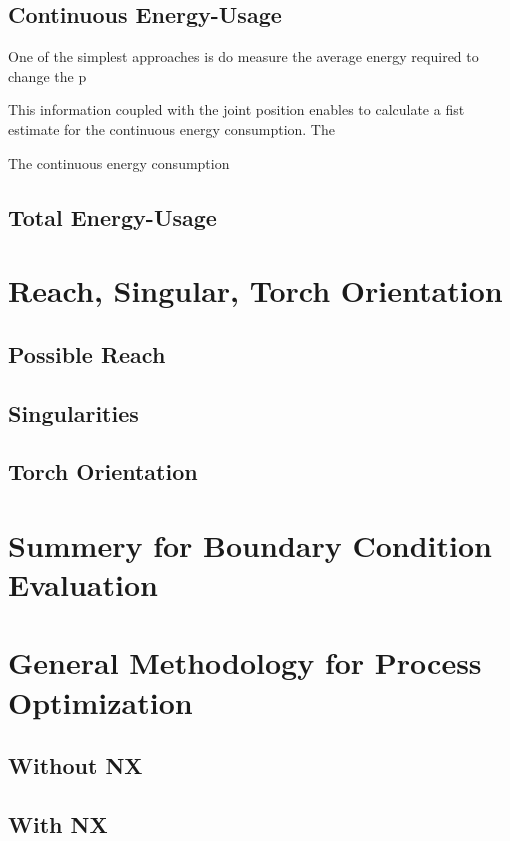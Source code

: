 \subsection{Continuous Energy-Usage}
One of the simplest approaches is do measure the average energy required to change the p

This information coupled with the joint position enables to calculate a fist estimate for the continuous energy consumption. The 

  
 
The continuous energy consumption 

\subsection{Total Energy-Usage}
\section{Reach, Singular, Torch Orientation}
\subsection{Possible Reach}
\subsection{Singularities }
\subsection{Torch Orientation}
\section{Summery for Boundary Condition Evaluation}
\section{General Methodology for Process Optimization}
\subsection{Without NX}
\subsection{With NX}